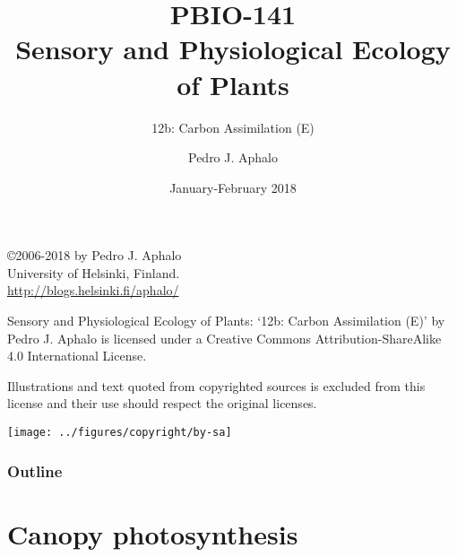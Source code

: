 \documentclass[10pt]{beamer}
\begin{document}
\title{PBIO-141\\Sensory and Physiological Ecology of  Plants}
\subtitle{12b: Carbon Assimilation (E)}
\author{Pedro J. Aphalo}
\date{January-February 2018}

  \begin{frame}
    \maketitle
  \end{frame}

  \begin{frame}[c]
    \begin{center}
      \begin{small}
        \copyright 2006-2018 by Pedro J. Aphalo\\
       University of Helsinki, Finland.\\
        \textcolor{blue}{\url{http://blogs.helsinki.fi/aphalo/}}\\[2ex]
      \end{small}

      \begin{footnotesize}
        Sensory and Physiological Ecology of  Plants: `12b: Carbon Assimilation (E)' by Pedro J. Aphalo is licensed under a Creative Commons Attribution-ShareAlike 4.0 International License.

        Illustrations and text quoted from copyrighted sources is excluded from this license and their use should respect the original licenses.\\[2ex]
      \end{footnotesize}

      \centering\texttt{[image: ../figures/copyright/by-sa]}
    \end{center}
  \end{frame}

  \begin{frame}
    \frametitle{Outline}
    \tableofcontents
  \end{frame}

\section{Canopy photosynthesis}
\end{document}
